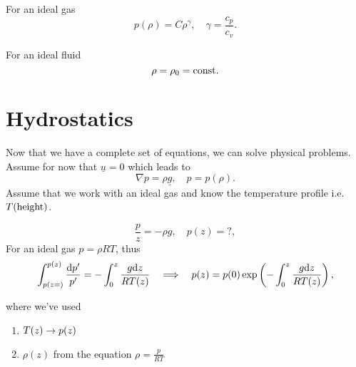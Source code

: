 \documentclass[11pt,oneside]{book}
\renewcommand{\vec}[1]{\underline{#1}}
\theoremstyle{definition} %
\theoremstyle{plain} %
\theoremstyle{remark} %
\theoremstyle{underline}
\begin{document}
  For an ideal gas
  \begin{displaymath}
    p(\rho) = C \rho ^\gamma, \quad \gamma = \frac{c_p}{c_v}.
  \end{displaymath}

  For an ideal fluid
  \begin{displaymath}
    \rho = \rho_0 = \textrm{const}.
  \end{displaymath}

  \section{Hydrostatics}
  Now that we have a complete set of equations, we can solve physical problems.
  Assume for now that $\vec u = 0$ which leads to 
  \begin{displaymath}
    \nabla p = \rho \vec g, \quad p = p(\rho).
  \end{displaymath}
  Assume that we work with an ideal gas and know the temperature profile i.e. $T(\textrm{height})$.
  
  \begin{figure}[h]
    \centering
  \end{figure}

  
  \begin{displaymath}
    \dfrac{p}{z} = - \rho g, \quad p(z) = ?,
  \end{displaymath}
  For an ideal gas $p = \rho R T$, thus
  \begin{displaymath}
    \int_{p(z = )}^{p(z)} \frac{\mathrm{d} p'}{p'} = - \int_0^z \frac{g \mathrm{d} z}{RT(z)} 
    \quad \Longrightarrow \quad p(z) = p(0) \exp\left( -\int_0^z \frac{g \mathrm{d} z}{RT(z)} \right),
  \end{displaymath}

  where we've used 
  \begin{enumerate}
    \item $T(z) \rightarrow p(z)$
    \item $\rho(z)$ from the equation $\rho=  \frac{p}{RT}$
  \end{enumerate}
\end{document}
